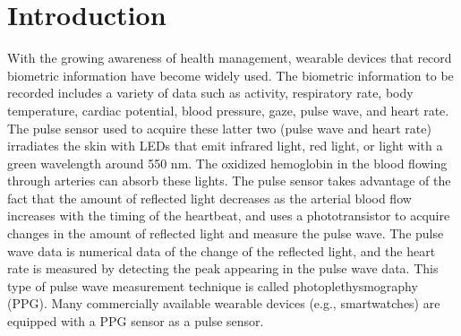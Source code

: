 \documentclass[sigconf]{acmart}
\begin{document}



\maketitle

\section{Introduction}
\label{sec:introduction}
With the growing awareness of health management, wearable devices that record biometric information have become widely used. The biometric information to be recorded includes a variety of data such as activity, respiratory rate, body temperature, cardiac potential, blood pressure, gaze, pulse wave, and heart rate. The pulse sensor used to acquire these latter two (pulse wave and heart rate) irradiates the skin with LEDs that emit infrared light, red light, or light with a green wavelength around 550 nm. The oxidized hemoglobin in the blood flowing through arteries can absorb these lights. The pulse sensor takes advantage of the fact that the amount of reflected light decreases as the arterial blood flow increases with the timing of the heartbeat, and uses a phototransistor to acquire changes in the amount of reflected light and measure the pulse wave. The pulse wave data is numerical data of the change of the reflected light, and the heart rate is measured by detecting the peak appearing in the pulse wave data. This type of pulse wave measurement technique is called photoplethysmography (PPG). Many commercially available wearable devices (e.g., smartwatches) are equipped with a PPG sensor as a pulse sensor.\par
\end{document}
